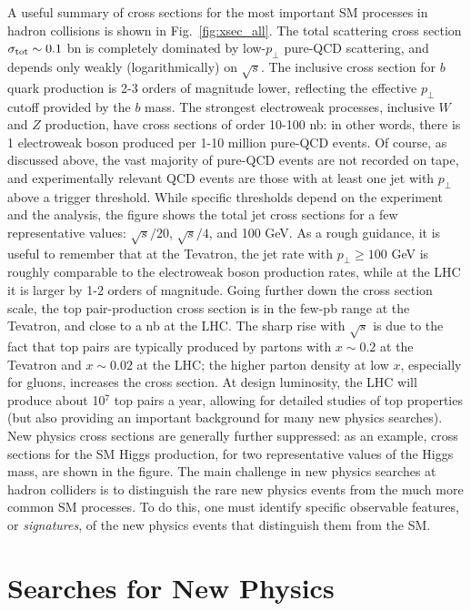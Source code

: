 \documentclass{ws-procs9x6}
\begin{document}
A useful summary of cross sections for the most important SM processes in hadron collisions is shown in Fig.~\ref{fig:xsec_all}. The total scattering cross section $\sigma_{\rm tot}\sim 0.1$ bn is completely dominated by low-$p_\perp$ pure-QCD scattering, and depends only weakly (logarithmically) on $\sqrt{s}$. The inclusive cross section for $b$ quark production is 2-3 orders of magnitude lower, reflecting the effective $p_\perp$ cutoff provided by the $b$ mass. The strongest electroweak processes, inclusive $W$ and $Z$ production, have cross sections of order 10-100 nb: in other words, there is 1 electroweak boson produced per 1-10 million pure-QCD events. Of course, as discussed above, the vast majority of pure-QCD events are not recorded on tape, and experimentally relevant QCD events are those with at least one jet with $p_\perp$ above a trigger threshold. While specific thresholds depend on the experiment and the analysis, the figure shows the total jet cross sections for a few representative values: $\sqrt{s}/20$, $\sqrt{s}/4$, and 100 GeV. As a rough guidance, it is useful to remember that at the Tevatron, the jet rate with $p_\perp\geq 100$ GeV is roughly comparable to the electroweak boson production rates, while at the LHC it is larger by 1-2 orders of magnitude. Going further down the cross section scale, the top pair-production cross section is in the few-pb range at the Tevatron, and close to a nb at the LHC. The sharp rise with $\sqrt{s}$ is due to the fact that top pairs are typically produced by partons with $x\sim 0.2$ at the Tevatron and $x\sim 0.02$ at the LHC; the higher parton density at low $x$, especially for gluons, increases the cross section. At design luminosity, the LHC will produce about 10$^7$ top pairs a year, allowing for detailed studies of top properties (but also providing an important background for many new physics searches). New physics cross sections are generally further suppressed: as an example, cross sections for the SM Higgs production, for two representative values of the Higgs mass, are shown in the figure. The main challenge in new physics searches at hadron colliders is to distinguish the rare new physics events from the much more common SM processes. To do this, one must identify specific observable features, or {\it signatures}, of the new physics events that distinguish them from the SM. 




\section{Searches for New Physics}
\label{sec:newphys}
\end{document}
